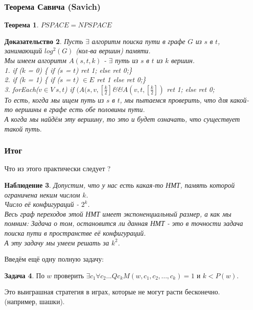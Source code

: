 \documentclass{beamer}
\theoremstyle{plain}
\newtheorem{thm}{Теорема}
\newtheorem{proof-rus}[thm]{Доказательство}
\newtheorem{obs}[thm]{Наблюдение}
\theoremstyle{definition}
\newtheorem{prob-rus}[thm]{Задача}
\begin{document}
\begin{frame}
    \frametitle{Теорема Савича (Savich)}
    \begin{thm}
        $PSPACE = NPSPACE$
    \end{thm}
    \small
    \begin{proof-rus}
        Пусть $\exists$ алгоритм поиска пути в графе $G$ из $s$ в $t$, занимающий
        $log^2(G)$ (кол-ва вершин) памяти. \\
        Мы имеем алгоритм $A(s, t, k)$ - $\exists$ путь из $s$ в $t$ из $k$ вершин. \\
        1. if ($k$ = 0) \{ if ($s$ = $t$) ret 1; else ret 0;\} \\
        2. if ($k$ = 1) \{ if ($s$ = $t$) $\in E$ ret 1 else ret 0;\} \\
        3. forEach($v \in V \ s,t$)
              if $(A(s, v, [\frac{k}{2}]$\&\&$A(v, t, [\frac{k}{2}])$ ret 1;
              else ret 0; \\
        То есть, когда мы ищем путь из $s$ в $t$, мы пытаемся проверить, что для какой-то
        вершины в графе есть обе половины пути. \\
        А когда мы найдём эту вершину, то это и будет означать, что существует такой путь.
    \end{proof-rus}
\end{frame}

\begin{frame}
    \frametitle{Итог}
    Что из этого практически следует ? \\
    \begin{obs}
        Допустим, что у нас есть какая-то НМТ, память которой ограничена неким числом $k$. \\
        Число её конфигураций - $2^k$. \\
        Весь граф переходов этой НМТ имеет экспоненциальный размер, а как мы помним: Задача о том,
        остановится ли данная НМТ - это в точности задача поиска пути в пространстве её конфигураций.\\
        А эту задачу мы умеем решать за $k^2$.
    \end{obs}
\end{frame}

\begin{frame}
    Введём ещё одну полную задачу:
    \begin{prob-rus}
        По $w$ проверить $\exists c_1 \forall c_2 ... Qc_k M(w, c_1, c_2,..., c_k) = 1$ и
        $k < P(w)$.
    \end{prob-rus}
    Это выиграшная стратегия в играх, которые не могут расти
    бесконечно. (например, шашки).
\end{frame}
\end{document}
